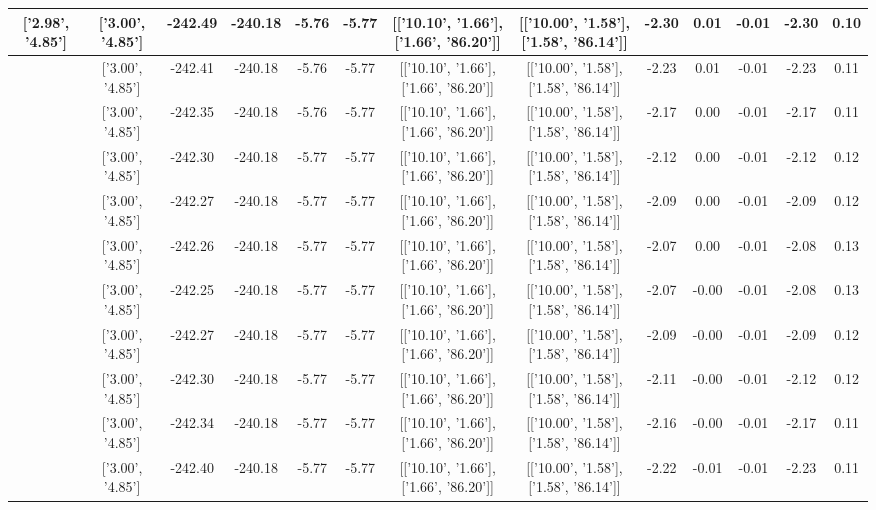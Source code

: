 \begin{table}[htbp]
\begin{adjustbox}{angle=90}
\begin{tabular}{|c|c|c|c|c|c|c|c|c|c|c|c|c|}
 ['2.98', '4.85'] & ['3.00', '4.85'] & -242.49 & -240.18 & -5.76 & -5.77 & [['10.10', '1.66'], ['1.66', '86.20']] & [['10.00', '1.58'], ['1.58', '86.14']] & -2.30 & 0.01 & -0.01 & -2.30 & 0.10\\ \hline
 ['2.98', '4.85'] & ['3.00', '4.85'] & -242.41 & -240.18 & -5.76 & -5.77 & [['10.10', '1.66'], ['1.66', '86.20']] & [['10.00', '1.58'], ['1.58', '86.14']] & -2.23 & 0.01 & -0.01 & -2.23 & 0.11\\ \hline
 ['2.99', '4.85'] & ['3.00', '4.85'] & -242.35 & -240.18 & -5.76 & -5.77 & [['10.10', '1.66'], ['1.66', '86.20']] & [['10.00', '1.58'], ['1.58', '86.14']] & -2.17 & 0.00 & -0.01 & -2.17 & 0.11\\ \hline
 ['2.99', '4.85'] & ['3.00', '4.85'] & -242.30 & -240.18 & -5.77 & -5.77 & [['10.10', '1.66'], ['1.66', '86.20']] & [['10.00', '1.58'], ['1.58', '86.14']] & -2.12 & 0.00 & -0.01 & -2.12 & 0.12\\ \hline
 ['2.99', '4.85'] & ['3.00', '4.85'] & -242.27 & -240.18 & -5.77 & -5.77 & [['10.10', '1.66'], ['1.66', '86.20']] & [['10.00', '1.58'], ['1.58', '86.14']] & -2.09 & 0.00 & -0.01 & -2.09 & 0.12\\ \hline
 ['3.00', '4.85'] & ['3.00', '4.85'] & -242.26 & -240.18 & -5.77 & -5.77 & [['10.10', '1.66'], ['1.66', '86.20']] & [['10.00', '1.58'], ['1.58', '86.14']] & -2.07 & 0.00 & -0.01 & -2.08 & 0.13\\ \hline
 ['3.00', '4.85'] & ['3.00', '4.85'] & -242.25 & -240.18 & -5.77 & -5.77 & [['10.10', '1.66'], ['1.66', '86.20']] & [['10.00', '1.58'], ['1.58', '86.14']] & -2.07 & -0.00 & -0.01 & -2.08 & 0.13\\ \hline
 ['3.00', '4.85'] & ['3.00', '4.85'] & -242.27 & -240.18 & -5.77 & -5.77 & [['10.10', '1.66'], ['1.66', '86.20']] & [['10.00', '1.58'], ['1.58', '86.14']] & -2.09 & -0.00 & -0.01 & -2.09 & 0.12\\ \hline
 ['3.01', '4.85'] & ['3.00', '4.85'] & -242.30 & -240.18 & -5.77 & -5.77 & [['10.10', '1.66'], ['1.66', '86.20']] & [['10.00', '1.58'], ['1.58', '86.14']] & -2.11 & -0.00 & -0.01 & -2.12 & 0.12\\ \hline
 ['3.01', '4.85'] & ['3.00', '4.85'] & -242.34 & -240.18 & -5.77 & -5.77 & [['10.10', '1.66'], ['1.66', '86.20']] & [['10.00', '1.58'], ['1.58', '86.14']] & -2.16 & -0.00 & -0.01 & -2.17 & 0.11\\ \hline
 ['3.02', '4.86'] & ['3.00', '4.85'] & -242.40 & -240.18 & -5.77 & -5.77 & [['10.10', '1.66'], ['1.66', '86.20']] & [['10.00', '1.58'], ['1.58', '86.14']] & -2.22 & -0.01 & -0.01 & -2.23 & 0.11\\ \hline

\end{tabular}
\end{adjustbox}
\end{table}
